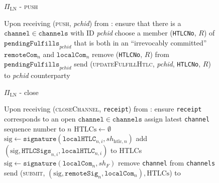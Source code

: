  \begin{figure}[H]
    \begin{protocolbox}{$\Pi_{\mathrm{LN}}$ - \textsc{push}}
      \begin{algorithmic}[1]
        \State Upon receiving (\textsc{push}, \textit{pchid}) from \environment:
        \Indent
          \State ensure that there is a $\mathtt{channel} \in \mathtt{channels}$
          with ID \textit{pchid}
          \State choose a member (\texttt{HTLCNo}, $R$) of
          $\mathtt{pendingFulfills}_{\mathit{pchid}}$ that is both in an
          ``irrevocably committed'' $\mathtt{remoteCom}_n$ and
          $\mathtt{localCom}_n$
          \State remove (\texttt{HTLCNo}, $R$) from
          $\mathtt{pendingFulfills}_{\mathit{pchid}}$
          \State send (\textsc{updateFulfillHtlc}, \textit{pchid},
          \texttt{HTLCNo}, $R$) to \textit{pchid} counterparty
        \EndIndent
      \end{algorithmic}
    \end{protocolbox}
    \caption{}
    \label{alg:protocol:pay:push}
  \end{figure}

  \begin{figure}[H]
    \begin{protocolbox}{$\Pi_{\mathrm{LN}}$ - close}
      \begin{algorithmic}[1]
        \State Upon receiving (\textsc{closeChannel}, \texttt{receipt}) from
        \environment:
        \Indent
          \State ensure \texttt{receipt} corresponds to an open
          $\mathtt{channel} \in \mathtt{channels}$
          \State assign latest \texttt{channel} sequence number to $n$
          \State $\mathrm{HTLCs} \gets \emptyset$
            \State $\mathrm{sig} \gets
            \mathtt{signature}\left(\mathtt{localHTLC}_{n, i},
            sh_{\mathrm{htlc}, n}\right)$
            \State add $\left(\mathrm{sig}, \mathtt{HTLCSigs}_{n, i},
            \mathtt{localHTLC}_{n, i}\right)$ to HTLCs
          \EndFor
          \State $\mathrm{sig} \gets
          \mathtt{signature}\left(\mathtt{localCom}_n, sh_F\right)$
          \State remove \texttt{channel} from \texttt{channels}
          \State send (\textsc{submit}, $\left(\mathrm{sig},
          \mathtt{remoteSig}_n, \mathtt{localCom}_n\right), \mathrm{HTLCs}$) to
          \ledger
        \EndIndent
      \end{algorithmic}
    \end{protocolbox}
    \caption{}
    \label{alg:protocol:close}
  \end{figure}

